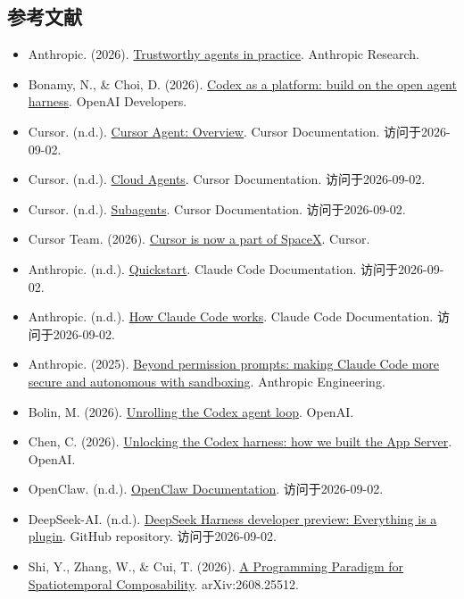 \hypertarget{ux53c2ux8003ux6587ux732e-118}{%
\subsection{参考文献}\label{ux53c2ux8003ux6587ux732e-118}}

\vspace{0.25em}
\begin{itemize}
\tightlist
\item
  Anthropic. (2026). \href{https://www.anthropic.com/research/trustworthy-agents}{Trustworthy agents in practice}. Anthropic Research.
\item
  Bonamy, N., \& Choi, D. (2026). \href{https://developers.openai.com/blog/codex-as-a-platform}{Codex as a platform: build on the open agent harness}. OpenAI Developers.
\item
  Cursor. (n.d.). \href{https://cursor.com/docs/agent/overview}{Cursor Agent: Overview}. Cursor Documentation. 访问于2026-09-02.
\item
  Cursor. (n.d.). \href{https://cursor.com/docs/cloud-agent}{Cloud Agents}. Cursor Documentation. 访问于2026-09-02.
\item
  Cursor. (n.d.). \href{https://cursor.com/docs/subagents}{Subagents}. Cursor Documentation. 访问于2026-09-02.
\item
  Cursor Team. (2026). \href{https://cursor.com/blog/joining-spacex}{Cursor is now a part of SpaceX}. Cursor.
\item
  Anthropic. (n.d.). \href{https://code.claude.com/docs/en/quickstart}{Quickstart}. Claude Code Documentation. 访问于2026-09-02.
\item
  Anthropic. (n.d.). \href{https://code.claude.com/docs/en/how-claude-code-works}{How Claude Code works}. Claude Code Documentation. 访问于2026-09-02.
\item
  Anthropic. (2025). \href{https://www.anthropic.com/engineering/claude-code-sandboxing}{Beyond permission prompts: making Claude Code more secure and autonomous with sandboxing}. Anthropic Engineering.
\item
  Bolin, M. (2026). \href{https://openai.com/index/unrolling-the-codex-agent-loop/}{Unrolling the Codex agent loop}. OpenAI.
\item
  Chen, C. (2026). \href{https://openai.com/index/unlocking-the-codex-harness/}{Unlocking the Codex harness: how we built the App Server}. OpenAI.
\item
  OpenClaw. (n.d.). \href{https://docs.openclaw.ai/}{OpenClaw Documentation}. 访问于2026-09-02.
\item
  DeepSeek-AI. (n.d.). \href{https://github.com/deepseek-ai/deepseek-harness}{DeepSeek Harness developer preview: Everything is a plugin}. GitHub repository. 访问于2026-09-02.
\item
  Shi, Y., Zhang, W., \& Cui, T. (2026). \href{https://arxiv.org/abs/2608.25512}{A Programming Paradigm for Spatiotemporal Composability}. arXiv:2608.25512.
\end{itemize}

\clearpage
